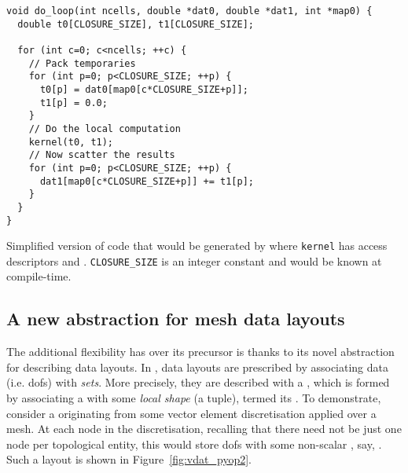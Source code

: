 \begin{listing}
  \begin{verbatim}
void do_loop(int ncells, double *dat0, double *dat1, int *map0) {
  double t0[CLOSURE_SIZE], t1[CLOSURE_SIZE];

  for (int c=0; c<ncells; ++c) {
    // Pack temporaries
    for (int p=0; p<CLOSURE_SIZE; ++p) {
      t0[p] = dat0[map0[c*CLOSURE_SIZE+p]];
      t1[p] = 0.0;
    }
    // Do the local computation
    kernel(t0, t1);
    // Now scatter the results
    for (int p=0; p<CLOSURE_SIZE; ++p) {
      dat1[map0[c*CLOSURE_SIZE+p]] += t1[p];
    }
  }
}
  \end{verbatim}
  \caption{
    Simplified version of code that would be generated by  where \texttt{kernel} has access descriptors  and .
    \texttt{CLOSURE_SIZE} is an integer constant and would be known at compile-time.
  }
  \label{lst:basicloop}
\end{listing}

\subsection{A new abstraction for mesh data layouts}

The additional flexibility  has over its precursor  is thanks to its novel abstraction for describing data layouts.
In , data layouts are prescribed by associating data (i.e. \glspl{dof}) with \textit{sets}.
More precisely, they are described with a , which is formed by associating a  with some \textit{local shape} (a tuple), termed its .
To demonstrate, consider a   originating from some vector element discretisation applied over a mesh.
At each node in the discretisation, recalling that there need not be just one node per topological entity, this  would store \glspl{dof} with some non-scalar , say, .
Such a layout is shown in Figure~\ref{fig:vdat_pyop2}.

